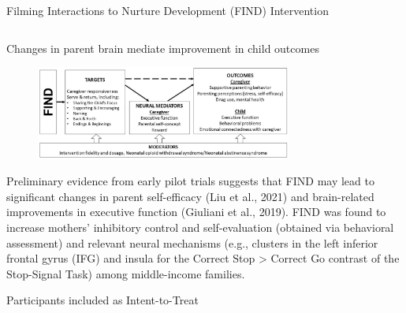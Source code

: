 \documentclass[final]{beamer}
\begin{document}
\begin{frame}[t]
\begin{columns}[t]
\begin{column}{\textwidth}
\begin{block}{Filming Interactions to Nurture Development (FIND) Intervention}
\begin{columns}[t]
\begin{column}{0.48\textwidth}
    \begin{block}{Changes in parent brain mediate improvement in child outcomes}
        \begin{figure}[ht]
          \centering
          \includegraphics[clip, width=0.75\textwidth]{model.png}
          \label{fig:model}
        \end{figure}
        Preliminary evidence from early pilot trials suggests that FIND may lead to significant changes in parent self-efficacy (Liu et al., 2021) and brain-related improvements in executive function (Giuliani et al., 2019). FIND was found to increase mothers’ inhibitory control and self-evaluation (obtained via behavioral assessment) and relevant neural mechanisms (e.g., clusters in the left inferior frontal gyrus (IFG) and insula for the Correct Stop > Correct Go contrast of the Stop-Signal Task) among middle-income families.  
        \end{block}

    \begin{block}{Participants included as Intent-to-Treat}

\end{block}
\end{column}
\end{columns}
\end{block}
\end{column}
\end{columns}
\end{frame}
\end{document}
